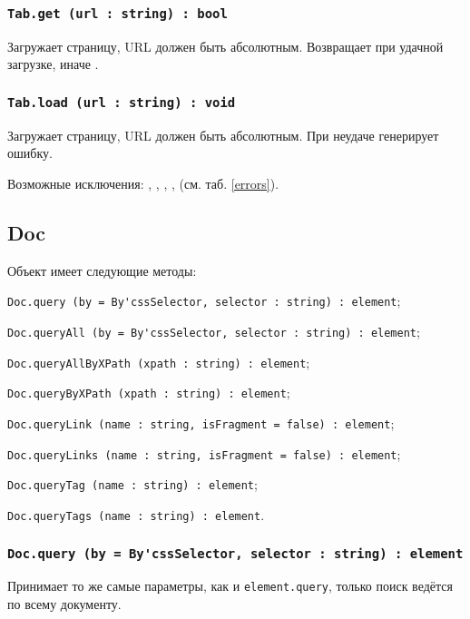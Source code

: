 \subsubsection{\lstinline|Tab.get (url : string) : bool|}

Загружает страницу, URL должен быть абсолютным. Возвращает \true{} при удачной загрузке, иначе \false.

\subsubsection{\lstinline|Tab.load (url : string) : void|}

Загружает страницу, URL должен быть абсолютным. При неудаче генерирует ошибку.

Возможные исключения: , , , ,  (см. таб. \ref{errors}).

\subsection{{\color{orange} Doc}}

Объект \dom{} имеет следующие методы:
\begin{icItems}
	\item \lstinline|Doc.query (by = By'cssSelector, selector : string) : element|;
	\item \lstinline|Doc.queryAll (by = By'cssSelector, selector : string) : element|;
	\item \lstinline|Doc.queryAllByXPath (xpath : string) : element|;
	\item \lstinline|Doc.queryByXPath (xpath : string) : element|;
	\item \lstinline|Doc.queryLink (name : string, isFragment = false) : element|;
	\item \lstinline|Doc.queryLinks (name : string, isFragment = false) : element|;
	\item \lstinline|Doc.queryTag (name : string) : element|;
	\item \lstinline|Doc.queryTags (name : string) : element|.
\end{icItems}

\subsubsection{\lstinline|Doc.query (by = By'cssSelector, selector : string) : element|}

Принимает то же самые параметры, как и \lstinline|element.query|, только поиск ведётся по всему документу.

